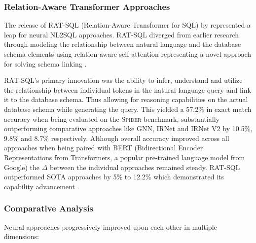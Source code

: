 \subsubsection{Relation-Aware Transformer Approaches}

The release of RAT-SQL (Relation-Aware Transformer for SQL) by \cite{RATSQL}
represented a leap for neural NL2SQL approaches. RAT-SQL diverged from earlier
research through modeling the relationship between natural language and the
database schema elements using relation-aware self-attention representing a
novel approach for solving schema linking \citep{RATSQL}.

RAT-SQL's primary innovation was the ability to infer, understand and utilize
the relationship between individual tokens in the natural language query and
link it to the database schema. Thus allowing for reasoning capabilities on the
actual database schema while generating the query. This yielded a 57.2\% in
exact match accuracy when being evaluated on the \textsc{Spider} benchmark,
substantially outperforming comparative approaches like GNN, IRNet and IRNet V2
by 10.5\%, 9.8\% and 8.7\% respectively. Although overall accuracy improved
across all approaches when being paired with BERT (Bidirectional Encoder
Representations from Transformers, a popular pre-trained language model from
Google) the $\Delta$ between the individual approaches remained steady. RAT-SQL
outperformed SOTA approaches by 5\% to 12.2\% which demonstrated its capability
advancement \citep{RATSQL}.

\subsubsection{Comparative Analysis}

Neural approaches progressively improved upon each other in multiple dimensions:


